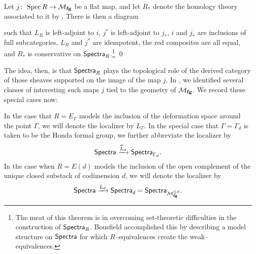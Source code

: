 \begin{theorem}
Let $j\colon\thinspace \operatorname{Spec} R \to \mathcal{M}_{\mathbf{fg}}$ be a flat map, and let $R_*$ denote the homology theory associated to it by .  There is then a diagram
\begin{center}
\end{center}
such that $L_R$ is left-adjoint to $i$, $j^*$ is left-adjoint to $j_*$, $i$ and $j_*$ are inclusions of full subcategories, $L_R$ and $j^*$ are idempotent, the red composites are all equal, and $R_*$ is conservative on $\mathsf{Spectra}_R$.\footnote{The meat of this theorem is in overcoming set-theoretic difficulties in the construction of $\mathsf{Spectra}_R$.  Bousfield accomplished this by describing a model structure on $\mathsf{Spectra}$ for which $R$--equivalences create the weak--equivalences.} \qed
\end{theorem}

The idea, then, is that $\mathsf{Spectra}_R$ plays the topological role of the derived category of those sheaves supported on the image of the map $j$.  In , we identified several classes of interesting such maps $j$ tied to the geometry of $\mathcal{M}_{\mathbf{fg}}$.  We record these special cases now:
\begin{definition}
In the case that $R = E_\Gamma$ models the inclusion of the deformation space around the point $\Gamma$, we will denote the localizer by $L_\Gamma$.  In the special case that $\Gamma = \Gamma_d$ is taken to be the Honda formal group, we further abbreviate the localizer by \[\mathsf{Spectra} \xrightarrow{\widehat L_d} \mathsf{Spectra}_{\Gamma_d}.\]  In the case when $R = E(d)$ models the inclusion of the open complement of the unique closed substack of codimension $d$, we will denote the localizer by \[\mathsf{Spectra} \xrightarrow{L_d} \mathsf{Spectra}_d = \mathsf{Spectra}_{\mathcal{M}_{\mathbf{fg}}^{\le d}}.\]
\end{definition}

